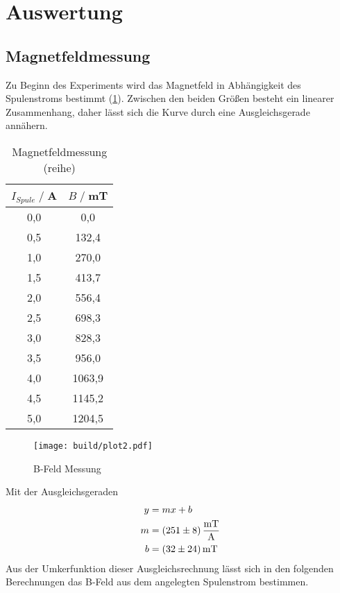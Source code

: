 \newpage
\section{Auswertung}

\subsection{Magnetfeldmessung}
Zu Beginn des Experiments wird das Magnetfeld in Abhängigkeit des Spulenstroms bestimmt (\ref{tab:Br}).
Zwischen den beiden Größen besteht ein linearer Zusammenhang, daher lässt sich die Kurve durch eine Ausgleichsgerade annähern.
\begin{table}[H]
    \centering
    \begin{tabular}{c c}
        \toprule
        $I_{Spule} \;/\;$A & $B\;/\;$mT\\
        \midrule
        0,0                 &0,0\\
        0,5                 &132,4\\
        1,0                 &270,0\\
        1,5                 &413,7\\
        2,0                 &556,4\\  
        2,5                 &698,3\\
        3,0                 &828,3\\
        3,5                 &956,0\\
        4,0                 &1063,9\\
        4,5                 &1145,2\\
        5,0                 &1204,5\\
        \bottomrule
    \end{tabular}
    \caption{Magnetfeldmessung (reihe)}
    \label{tab:Br}
\end{table}
\begin{figure}[H]
    \centering
    \texttt{[image: build/plot2.pdf]}
    \caption{B-Feld Messung}
    \label{fig:Br}
\end{figure}
Mit der Ausgleichsgeraden
\begin{align*}
    y &= mx + b\\
    m &= \SI{251\pm 8}{\milli \tesla \per \ampere} \\  
    b &= \SI{32\pm 24}{\milli \tesla}\\
\end{align*}
Aus der Umkerfunktion dieser Ausgleichsrechnung lässt sich in den folgenden Berechnungen das B-Feld aus dem angelegten Spulenstrom bestimmen.

